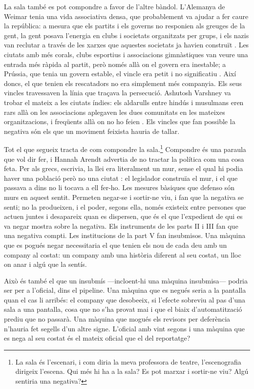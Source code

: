 La sala també es pot compondre a favor de l'altre bàndol. L'Alemanya de Weimar tenia una vida associativa densa, que probablement va ajudar a fer caure la república: a mesura que els partits i els governs no responien als greuges de la gent, la gent posava l'energia en clubs i societats organitzats per grups, i els nazis van reclutar a través de les xarxes que aquestes societats ja havien construït \autocite{berman1997weimar}. Les ciutats amb més corals, clubs esportius i associacions gimnàstiques van veure una entrada més ràpida al partit, però només allà on el govern era inestable; a Prússia, que tenia un govern estable, el vincle era petit i no significatiu \autocite{satyanath2017bowling}. Així doncs, el que tenien els rescatadors no era simplement més companyia. Els seus vincles travessaven la línia que traçava la persecució. Ashutosh Varshney va trobar el mateix a les ciutats índies: els aldarulls entre hindús i musulmans eren rars allà on les associacions aplegaven les dues comunitats en les mateixes organitzacions, i freqüents allà on no ho feien \autocite{varshney2002ethnic}. Els vincles que fan possible la negativa són els que un moviment feixista hauria de tallar.

Tot el que segueix tracta de com compondre la sala.\footnote{La sala és l'escenari, i com diria la meva professora de teatre, l'escenografia dirigeix l'escena. Qui més hi ha a la sala? Es pot marxar i sortir-ne viu? Algú sentiria una negativa?} Compondre és una paraula que vol dir fer, i Hannah Arendt advertia de no tractar la política com una cosa feta. Per als grecs, escrivia, la llei era literalment un mur, sense el qual hi podia haver una població però no una ciutat \autocite{arendt1958human}: el legislador construïa el mur, i el que passava a dins no li tocava a ell fer-ho. Les mesures bàsiques que defenso són murs en aquest sentit. Permeten negar-se i sortir-ne viu, i fan que la negativa se senti; no la produeixen, i el poder, segons ella, només existeix entre persones que actuen juntes i desapareix quan es dispersen, que és el que l'expedient de qui es va negar mostra sobre la negativa. Els instruments de les parts II i III fan que una negativa compti. Les institucions de la part V fan insubmisos. Una màquina que es pogués negar necessitaria el que tenien els nou de cada deu amb un company al costat: un company amb una història diferent al seu costat, un lloc on anar i algú que la sentís.

Això és també el que un insubmís —incloent-hi una màquina insubmisa— podria ser per a l'oficial, dins el pipeline. Una màquina que es negués seria a la pantalla quan el cas li arribés: el company que desobeeix, si l'efecte sobreviu al pas d'una sala a una pantalla, cosa que no s'ha provat mai i que el biaix d'automatització prediu que no passarà. Una màquina que mogués els revisors per deferència n'hauria fet segells d'un altre signe. L'oficial amb vint segons i una màquina que es nega al seu costat és el mateix oficial que el del reportatge?

